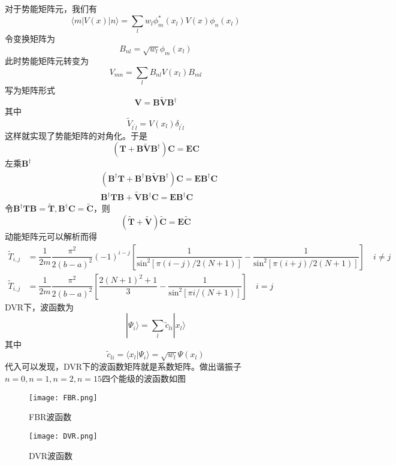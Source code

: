 \documentclass[]{article}
\begin{document}
对于势能矩阵元，我们有
\begin{equation}
\langle m|V(x)|n\rangle=\sum\limits_lw_l\phi_m^*(x_l)V(x)\phi_n(x_l)	
\end{equation}
令变换矩阵为
\begin{equation}
	B_{nl}=\sqrt{w_l}\phi_m(x_l)
\end{equation}
此时势能矩阵元转变为
\begin{equation}
	V_{mn}=\sum\limits_lB_{nl}V(x_l)B_{ml}
\end{equation}
写为矩阵形式
\begin{equation}
	\mathbf{V}=\mathbf{B\tilde{V}B^\dagger}
\end{equation}
其中
\begin{equation}
	\tilde{V}_{l^\prime l}=V(x_l)\delta_{l^\prime l}
\end{equation}
这样就实现了势能矩阵的对角化。于是
\begin{equation}
	(\mathbf{T}+\mathbf{B\tilde{V}B^\dagger})\mathbf{C}=\mathbf{EC}
\end{equation}
左乘$\mathbf{B^\dagger}$
\begin{align}
	&(\mathbf{B^\dagger}\mathbf{T}+\mathbf{B^\dagger}\mathbf{B\tilde{V}B^\dagger})\mathbf{C}=\mathbf{E}\mathbf{B^\dagger C}\nonumber\\
	&\mathbf{B^\dagger TB+\tilde{V}}\mathbf{B^\dagger C}=\mathbf{EB^\dagger C}
\end{align}
令$\mathbf{B^\dagger TB}=\mathbf{\tilde{T}}, \mathbf{B^\dagger C}=\mathbf{\tilde{C}}$，则
\begin{equation}
	(\mathbf{\tilde{T}+\tilde{V}})\mathbf{\tilde{C}}=\mathbf{E\tilde{C}}
\end{equation}
动能矩阵元可以解析而得
\begin{align}
	\tilde{T}_{i,j}&=\dfrac{1}{2m}\dfrac{\pi^2}{2(b-a)^2}(-1)^{i-j}\left[ \dfrac{1}{\mathrm{sin}^2[\pi (i-j)/2(N+1)]}-\dfrac{1}{\mathrm{sin}^2[\pi (i+j)/2(N+1)]}\right] \quad i\neq j \nonumber\\
	\tilde{T}_{i,j}&=\dfrac{1}{2m}\dfrac{\pi^2}{2(b-a)^2}\left[ \dfrac{2(N+1)^2+1}{3}-\dfrac{1}{\mathrm{sin}^2[\pi i/(N+1)]}\right] \quad i=j
\end{align}
DVR下，波函数为
\begin{equation}
	|\Psi_i\rangle=\sum\limits_l\tilde{c}_{li}|x_l\rangle
\end{equation}
其中
\begin{equation}
	\tilde{c}_{li}=\langle x_l|\Psi_i\rangle=\sqrt{w_l}\Psi(x_l)
\end{equation}
代入可以发现，DVR下的波函数矩阵就是系数矩阵。做出谐振子$n=0, n=1, n=2, n=15$四个能级的波函数如图
\begin{figure}[H]
	\centering
	\texttt{[image: FBR.png]}
	\caption{FBR波函数}
	\label{Figure 1}
\end{figure}
\begin{figure}[H]
	\centering
	\texttt{[image: DVR.png]}
	\caption{DVR波函数}
	\label{Figure 2}
\end{figure}
\end{document}
